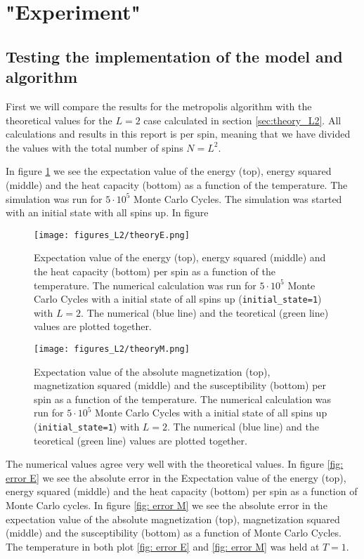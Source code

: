 \documentclass[11pt,a4wide]{article}
\begin{document}
\section{"Experiment"}
\subsection{Testing the implementation of the model and algorithm}
First we will compare the results for the metropolis algorithm with the theoretical values for the $L=2$ case calculated in section \ref{sec:theory_L2}. All calculations and results in this report is per spin, meaning that we have divided the values with the total number of spins $N=L^2$. 

In figure \ref{fig:theory E} we see the expectation value of the energy (top), energy squared (middle) and the heat capacity (bottom) as a function of the temperature. The simulation was run for $5\cdot10^5$ Monte Carlo Cycles. The simulation was started with an initial state with all spins up. In figure 

\begin{figure}[htp]
\centering
\texttt{[image: figures\_L2/theoryE.png]}
\caption{Expectation value of the energy (top), energy squared (middle) and the heat capacity (bottom) per spin as a function of the temperature. The numerical calculation was run for $5\cdot10^5$ Monte Carlo Cycles with a initial state of all spins up (\texttt{initial\_state=1}) with $L=2$. The numerical (blue line) and the teoretical (green line) values are plotted together.}
\label{fig:theory E}
\end{figure}

\begin{figure}[htp]
\centering
\texttt{[image: figures\_L2/theoryM.png]}
\caption{ Expectation value of the absolute magnetization (top), magnetization squared (middle) and the susceptibility (bottom) per spin as a function of the temperature. The numerical calculation was run for $5\cdot10^5$ Monte Carlo Cycles with a initial state of all spins up (\texttt{initial\_state=1}) with $L=2$. The numerical (blue line) and the teoretical (green line) values are plotted together.}
\label{fig:theory M}
\end{figure}

The numerical values agree very well with the theoretical values. In figure \ref{fig: error E} we see the absolute error in the Expectation value of the energy (top), energy squared (middle) and the heat capacity (bottom) per spin as a function of Monte Carlo cycles. In figure \ref{fig: error M} we see the absolute error in the expectation value of the absolute magnetization (top), magnetization squared (middle) and the susceptibility (bottom) as a function of Monte Carlo Cycles. The temperature in both plot \ref{fig: error E} and \ref{fig: error M} was held at $T=1$.
\end{document}
